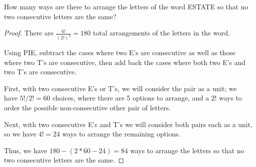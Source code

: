 \documentclass{subfiles}
\begin{document}
\begin{problem}
How many ways are there to arrange the letters of the word ESTATE so that no two consecutive letters are the same?
\end{problem}
\begin{proof}
	There are $\frac{6!}{(2!)^2}=180$ total arrangements of the letters in the word.

	Using PIE, subtract the cases where two E's are consecutive as well as those where two T's are consecutive, then add back the cases where both two E's and two T's are consecutive.

	First, with two consecutive E's or T's, we will consider the pair as a unit; we have $5!/2! = 60$ choices, where there are 5 options to arrange, and a $2!$ ways to order the possible non-consecutive other pair of letters.

	Next, with two consecutive E's and T's we will consider both pairs each as a unit, so we have $4! = 24$ ways to arrange the remaining options.

	Thus, we have $180-(2*60-24) = 84$ ways to arrange the letters so that no two consecutive letters are the same.
\end{proof}
\end{document}
